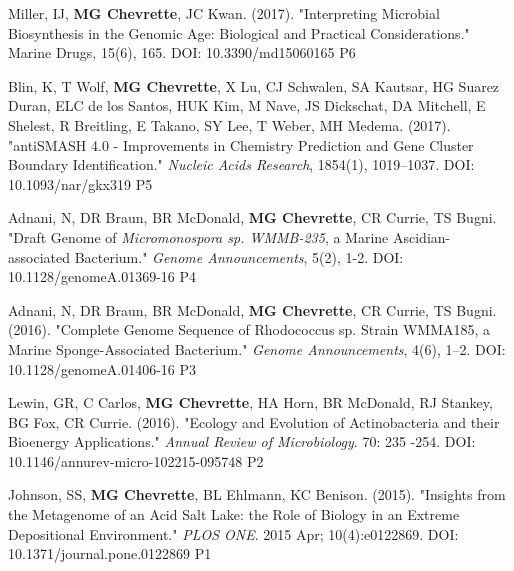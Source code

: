 \begin{cvpubs}
  \cvpub
    {Miller, IJ, \textbf{MG Chevrette}, JC Kwan. (2017). "Interpreting Microbial Biosynthesis in the Genomic Age: Biological and Practical Considerations." Marine Drugs, 15(6), 165. DOI: 10.3390/md15060165} %
    {P6} %

  \cvpub
    {Blin, K, T Wolf, \textbf{MG Chevrette}, X Lu, CJ Schwalen, SA Kautsar, HG Suarez Duran, ELC de los Santos, HUK Kim, M Nave, JS Dickschat, DA Mitchell, E Shelest, R Breitling, E Takano, SY Lee, T Weber, MH Medema. (2017). "antiSMASH 4.0 - Improvements in Chemistry Prediction and Gene Cluster Boundary Identification." \textit{Nucleic Acids Research}, 1854(1), 1019–1037. DOI: 10.1093/nar/gkx319}  %
    {P5} %

  \cvpub
    {Adnani, N, DR Braun, BR McDonald, \textbf{MG Chevrette}, CR Currie, TS Bugni. "Draft Genome of \textit{Micromonospora sp. WMMB-235}, a Marine Ascidian-associated Bacterium." \textit{Genome Announcements}, 5(2), 1-2. DOI: 10.1128/genomeA.01369-16} %
    {P4} %

  \cvpub
  {Adnani, N, DR Braun, BR McDonald, \textbf{MG Chevrette}, CR Currie, TS Bugni. (2016). "Complete Genome Sequence of Rhodococcus sp. Strain WMMA185, a Marine Sponge-Associated Bacterium." \textit{Genome Announcements}, 4(6), 1–2. DOI: 10.1128/genomeA.01406-16} %
    {P3} %

  \cvpub
    {Lewin, GR, C Carlos, \textbf{MG Chevrette}, HA Horn, BR McDonald, RJ Stankey, BG Fox, CR Currie. (2016). "Ecology and Evolution of Actinobacteria and their Bioenergy Applications." \textit{Annual Review of Microbiology}. 70: 235 -254. DOI: 10.1146/annurev-micro-102215-095748} %
    {P2} %

  \cvpub
    {Johnson, SS, \textbf{MG Chevrette}, BL Ehlmann, KC Benison. (2015). "Insights from the Metagenome of an Acid Salt Lake: the Role of Biology in an Extreme Depositional Environment."  \textit{PLOS ONE}. 2015 Apr; 10(4):e0122869. DOI: 10.1371/journal.pone.0122869} %
    {P1} %

\end{cvpubs}


